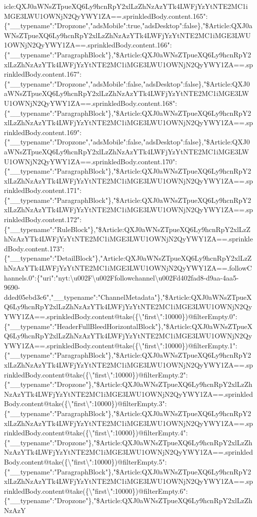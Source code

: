 icle:QXJ0aWNsZTpueXQ6Ly9hcnRpY2xlLzZhNzAzYTk4LWFjYzYtNTE2MC1iMGE3LWU1OWNjN2QyYWY1ZA==.sprinkledBody.content.165":\{"\_\_typename":"Dropzone","adsMobile":true,"adsDesktop":false\},"\$Article:QXJ0aWNsZTpueXQ6Ly9hcnRpY2xlLzZhNzAzYTk4LWFjYzYtNTE2MC1iMGE3LWU1OWNjN2QyYWY1ZA==.sprinkledBody.content.166":\{"\_\_typename":"ParagraphBlock"\},"\$Article:QXJ0aWNsZTpueXQ6Ly9hcnRpY2xlLzZhNzAzYTk4LWFjYzYtNTE2MC1iMGE3LWU1OWNjN2QyYWY1ZA==.sprinkledBody.content.167":\{"\_\_typename":"Dropzone","adsMobile":false,"adsDesktop":false\},"\$Article:QXJ0aWNsZTpueXQ6Ly9hcnRpY2xlLzZhNzAzYTk4LWFjYzYtNTE2MC1iMGE3LWU1OWNjN2QyYWY1ZA==.sprinkledBody.content.168":\{"\_\_typename":"ParagraphBlock"\},"\$Article:QXJ0aWNsZTpueXQ6Ly9hcnRpY2xlLzZhNzAzYTk4LWFjYzYtNTE2MC1iMGE3LWU1OWNjN2QyYWY1ZA==.sprinkledBody.content.169":\{"\_\_typename":"Dropzone","adsMobile":false,"adsDesktop":false\},"\$Article:QXJ0aWNsZTpueXQ6Ly9hcnRpY2xlLzZhNzAzYTk4LWFjYzYtNTE2MC1iMGE3LWU1OWNjN2QyYWY1ZA==.sprinkledBody.content.170":\{"\_\_typename":"ParagraphBlock"\},"\$Article:QXJ0aWNsZTpueXQ6Ly9hcnRpY2xlLzZhNzAzYTk4LWFjYzYtNTE2MC1iMGE3LWU1OWNjN2QyYWY1ZA==.sprinkledBody.content.171":\{"\_\_typename":"ParagraphBlock"\},"\$Article:QXJ0aWNsZTpueXQ6Ly9hcnRpY2xlLzZhNzAzYTk4LWFjYzYtNTE2MC1iMGE3LWU1OWNjN2QyYWY1ZA==.sprinkledBody.content.172":\{"\_\_typename":"RuleBlock"\},"\$Article:QXJ0aWNsZTpueXQ6Ly9hcnRpY2xlLzZhNzAzYTk4LWFjYzYtNTE2MC1iMGE3LWU1OWNjN2QyYWY1ZA==.sprinkledBody.content.173":\{"\_\_typename":"DetailBlock"\},"Article:QXJ0aWNsZTpueXQ6Ly9hcnRpY2xlLzZhNzAzYTk4LWFjYzYtNTE2MC1iMGE3LWU1OWNjN2QyYWY1ZA==.followChannels.0":\{"uri":"nyt:\textbackslash{}u002F\textbackslash{}u002Ffollowchannel\textbackslash{}u002Fd402fad8-d9aa-4aa5-9690-dded05ebd3c6","\_\_typename":"ChannelMetadata"\},"\$Article:QXJ0aWNsZTpueXQ6Ly9hcnRpY2xlLzZhNzAzYTk4LWFjYzYtNTE2MC1iMGE3LWU1OWNjN2QyYWY1ZA==.sprinkledBody.content@take(\{\textbackslash{}"first\textbackslash{}":10000\})@filterEmpty.0":\{"\_\_typename":"HeaderFullBleedHorizontalBlock"\},"\$Article:QXJ0aWNsZTpueXQ6Ly9hcnRpY2xlLzZhNzAzYTk4LWFjYzYtNTE2MC1iMGE3LWU1OWNjN2QyYWY1ZA==.sprinkledBody.content@take(\{\textbackslash{}"first\textbackslash{}":10000\})@filterEmpty.1":\{"\_\_typename":"ParagraphBlock"\},"\$Article:QXJ0aWNsZTpueXQ6Ly9hcnRpY2xlLzZhNzAzYTk4LWFjYzYtNTE2MC1iMGE3LWU1OWNjN2QyYWY1ZA==.sprinkledBody.content@take(\{\textbackslash{}"first\textbackslash{}":10000\})@filterEmpty.2":\{"\_\_typename":"Dropzone"\},"\$Article:QXJ0aWNsZTpueXQ6Ly9hcnRpY2xlLzZhNzAzYTk4LWFjYzYtNTE2MC1iMGE3LWU1OWNjN2QyYWY1ZA==.sprinkledBody.content@take(\{\textbackslash{}"first\textbackslash{}":10000\})@filterEmpty.3":\{"\_\_typename":"ParagraphBlock"\},"\$Article:QXJ0aWNsZTpueXQ6Ly9hcnRpY2xlLzZhNzAzYTk4LWFjYzYtNTE2MC1iMGE3LWU1OWNjN2QyYWY1ZA==.sprinkledBody.content@take(\{\textbackslash{}"first\textbackslash{}":10000\})@filterEmpty.4":\{"\_\_typename":"Dropzone"\},"\$Article:QXJ0aWNsZTpueXQ6Ly9hcnRpY2xlLzZhNzAzYTk4LWFjYzYtNTE2MC1iMGE3LWU1OWNjN2QyYWY1ZA==.sprinkledBody.content@take(\{\textbackslash{}"first\textbackslash{}":10000\})@filterEmpty.5":\{"\_\_typename":"ParagraphBlock"\},"\$Article:QXJ0aWNsZTpueXQ6Ly9hcnRpY2xlLzZhNzAzYTk4LWFjYzYtNTE2MC1iMGE3LWU1OWNjN2QyYWY1ZA==.sprinkledBody.content@take(\{\textbackslash{}"first\textbackslash{}":10000\})@filterEmpty.6":\{"\_\_typename":"Dropzone"\},"\$Article:QXJ0aWNsZTpueXQ6Ly9hcnRpY2xlLzZhNzAzY